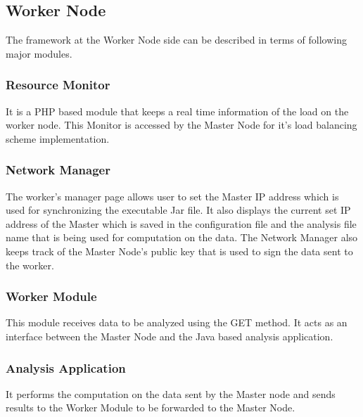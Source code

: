 \documentclass[10pt,journal,compsoc]{IEEEtran}
\begin{document}
\subsection{Worker Node}
The framework at the Worker Node side can be described in terms of following major modules.

\subsubsection{Resource Monitor}
It is a PHP based module that keeps a real time information of the load on the worker node. This Monitor is accessed by the Master Node for it's load balancing scheme implementation. 

\subsubsection{Network Manager}
The worker’s manager page allows user to set the Master IP address which is used for synchronizing the executable Jar file. It also displays the current set IP address of the Master which is saved in the configuration file and the analysis file name that is being used for computation on the data. The Network Manager also keeps track of the Master Node's public key that is used to sign the data sent to the worker.

\subsubsection{Worker Module}
This module receives data to be analyzed using the GET method. It acts as an interface between the Master Node and the Java based analysis application.

\subsubsection{Analysis Application}
It performs the computation on the data sent by the Master node and sends results to the Worker Module to be forwarded to the Master Node. 
\end{document}
